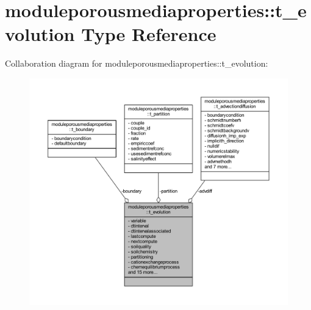 \hypertarget{structmoduleporousmediaproperties_1_1t__evolution}{}\section{moduleporousmediaproperties\+:\+:t\+\_\+evolution Type Reference}
\label{structmoduleporousmediaproperties_1_1t__evolution}


Collaboration diagram for moduleporousmediaproperties\+:\+:t\+\_\+evolution\+:\nopagebreak
\begin{figure}[H]
\begin{center}
\leavevmode
\includegraphics[width=350pt]{structmoduleporousmediaproperties_1_1t__evolution__coll__graph}
\end{center}
\end{figure}
